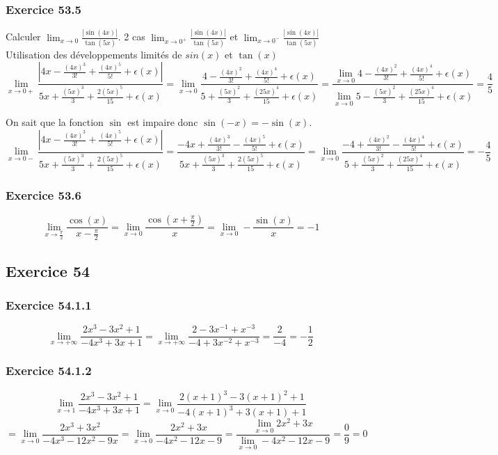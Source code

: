 \documentclass[]{book}
\theoremstyle{definition}
\begin{document}
\subsubsection*{Exercice 53.5}
Calculer $\lim_{x\to0}\frac{|\sin(4x)|}{\tan(5x)}$. 2 cas $\lim_{x\to0^+}\frac{|\sin(4x)|}{\tan(5x)}$ et $\lim_{x\to0^-}\frac{|\sin(4x)|}{\tan(5x)}$
Utilisation des d\'eveloppements limit\'es de $sin(x)$ et $\tan(x)$
$$\lim_{x\to0+}\frac{|4x-\frac{(4x)^3}{3!}+\frac{(4x)^5}{5!}+\epsilon(x)|}{5x+\frac{(5x)^3}{3}+\frac{2(5x)^5}{15}+\epsilon(x)} = \lim_{x\to0}\frac{4-\frac{(4x)^2}{3!}+\frac{(4x)^4}{5!}+\epsilon(x)}{5+\frac{(5x)^2}{3}+\frac{(25x)^4}{15}+\epsilon(x)} = \frac{\lim_{x\to0}4-\frac{(4x)^2}{3!}+\frac{(4x)^4}{5!}+\epsilon(x)}{\lim_{x\to0}5-\frac{(5x)^2}{3}+\frac{(25x)^4}{15}+\epsilon(x)} = \frac{4}{5}$$

On sait que la fonction $\sin$ est impaire donc $\sin(-x) = -\sin(x)$.
$$\lim_{x\to0-}\frac{|4x-\frac{(4x)^3}{3!}+\frac{(4x)^5}{5!}+\epsilon(x)|}{5x+\frac{(5x)^3}{3}+\frac{2(5x)^5}{15}+\epsilon(x)} = \frac{-4x+\frac{(4x)^3}{3!}-\frac{(4x)^5}{5!}+\epsilon(x)}{5x+\frac{(5x)^3}{3}+\frac{2(5x)^5}{15}+\epsilon(x)} = \lim_{x\to0}\frac{-4+\frac{(4x)^2}{3!}-\frac{(4x)^4}{5!}+\epsilon(x)}{5+\frac{(5x)^2}{3}+\frac{(25x)^4}{15}+\epsilon(x)} = -\frac{4}{5}$$

\subsubsection*{Exercice 53.6}
$$\lim_{x\to\frac{\pi}{2}}\frac{\cos(x)}{x-\frac{\pi}{2}} = \lim_{x\to0}\frac{\cos(x+\frac{\pi}{2})}{x} = \lim_{x\to0}-\frac{\sin(x)}{x} = -1$$

\subsection*{Exercice 54}
\subsubsection*{Exercice 54.1.1}
$$\lim_{x\to+\infty}\frac{2x^3-3x^2+1}{-4x^3+3x+1} = \lim_{x\to+\infty}\frac{2-3x^{-1}+x^{-3}}{-4+3x^{-2}+x^{-3}} = \frac{2}{-4} = -\frac{1}{2}$$

\subsubsection*{Exercice 54.1.2}
$$\lim_{x\to1}\frac{2x^3-3x^2+1}{-4x^3+3x+1} = \lim_{x\to0}\frac{2(x+1)^3-3(x+1)^2+1}{-4(x+1)^3+3(x+1)+1}$$
$$ = \lim_{x\to0}\frac{2x^3+3x^2}{-4x^3-12x^2-9x} = \lim_{x\to0}\frac{2x^2+3x}{-4x^2-12x-9} = \frac{\lim_{x\to0}2x^2+3x}{\lim_{x\to0}-4x^2-12x-9} = \frac{0}{9} =0$$
\end{document}
